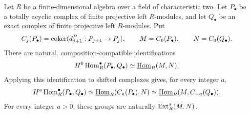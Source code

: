 \begin{lemma}\label{conv:comparison}
Let $R$ be a finite-dimensional algebra over a field of characteristic
two.  Let $P_\bullet$ be a totally acyclic complex of finite projective
left $R$-modules, and let $Q_\bullet$ be an exact complex of finite
projective left $R$-modules.  Put
\[
 C_j(P_\bullet)=\operatorname{coker}(d^P_{j+1}:P_{j+1}\to P_j),\qquad
 M=C_0(P_\bullet),\qquad N=C_0(Q_\bullet).
\]
There are natural, composition-compatible identifications
\[
 H^0\operatorname{Hom}_R^\bullet(P_\bullet,Q_\bullet)
       \simeq\underline{\operatorname{Hom}}_{R}(M,N).
\]
Applying this identification to shifted complexes gives, for every
integer $a$,
\begin{equation}\label{conv:shift-comparison}
 H^a\operatorname{Hom}_R^\bullet(P_\bullet,Q_\bullet)
 \simeq\underline{\operatorname{Hom}}_{R}(C_a(P_\bullet),N)
 \simeq\underline{\operatorname{Hom}}_{R}(M,C_{-a}(Q_\bullet)).
\end{equation}
For every integer $a>0$, these groups are naturally
$\operatorname{Ext}_R^a(M,N)$.
\end{lemma}

